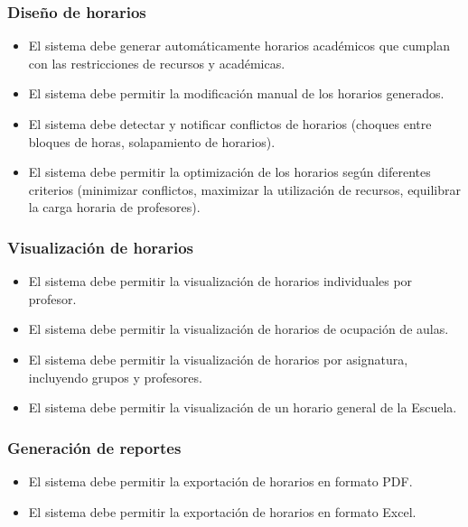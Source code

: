 \documentclass{article} %
\begin{document}
    \subsubsection{Diseño de horarios}
    \begin{itemize}
        \item El sistema debe generar automáticamente horarios académicos que cumplan con las restricciones de recursos y académicas.
        \item El sistema debe permitir la modificación manual de los horarios generados.
        \item El sistema debe detectar y notificar conflictos de horarios (choques entre bloques de horas, solapamiento de horarios).
        \item El sistema debe permitir la optimización de los horarios según diferentes criterios (minimizar conflictos, maximizar la utilización de recursos, equilibrar la carga horaria de profesores).
    \end{itemize}
    
    \subsubsection{Visualización de horarios}
    \begin{itemize}
        \item El sistema debe permitir la visualización de horarios individuales por profesor.
        \item El sistema debe permitir la visualización de horarios de ocupación de aulas.
        \item El sistema debe permitir la visualización de horarios por asignatura, incluyendo grupos y profesores.
        \item El sistema debe permitir la visualización de un horario general de la Escuela.
    \end{itemize}
    
    \subsubsection{Generación de reportes}
    \begin{itemize}
        \item El sistema debe permitir la exportación de horarios en formato PDF.
        \item El sistema debe permitir la exportación de horarios en formato Excel.
    \end{itemize}
\end{document}
